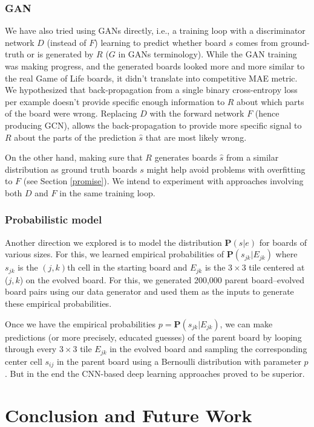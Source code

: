 \documentclass[conference]{IEEEtran}
\begin{document}
\subsubsection{GAN}
We have also tried using GANs directly, i.e., a training loop with a discriminator network $D$ (instead of $F$) learning to predict whether board $s$ comes from ground-truth or is generated by $R$ ($G$ in GANs terminology). While the GAN training was making progress, and the generated boards looked more and more similar to the real Game of Life boards, it didn't translate into competitive MAE metric. We hypothesized that back-propagation from a single binary cross-entropy loss per example doesn't provide specific enough information to $R$ about which parts of the board were wrong. Replacing $D$ with the forward network $F$ (hence producing GCN), allows the back-propagation to provide more specific signal to $R$ about the parts of the prediction $\hat s$ that are most likely wrong.

On the other hand, making sure that $R$ generates boards $\hat s$ from a similar distribution as ground truth boards $s$ might help avoid problems with overfitting to $F$ (see Section \ref{promise}). We intend to experiment with approaches involving both $D$ and $F$ in the same training loop.

\subsubsection{Probabilistic model}
Another direction we explored is to model the distribution $\mathbf P(s | e)$ for boards of various sizes. For this, we learned empirical probabilities of $\mathbf P(s_{jk} | E_{jk})$ where $s_{jk}$ is the $(j, k)$th cell in the starting board and $E_{jk}$ is the $3 \times 3$ tile centered at ($j, k$) on the evolved board. For this, we generated 200,000 parent board--evolved board pairs using our data generator and used them as the inputs to generate these empirical probabilities. 

Once we have the empirical probabilities $p = \mathbf P(s_{jk} | E_{jk})$, we can make predictions (or more precisely, educated guesses) of the parent board by looping through every $3 \times 3$ tile $E_{jk}$ in the evolved board and sampling the corresponding center cell $s_{ij}$ in the parent board using a Bernoulli distribution with parameter $p$. But in the end the CNN-based deep learning approaches proved to be superior.

\section{Conclusion and Future Work}
\end{document}
